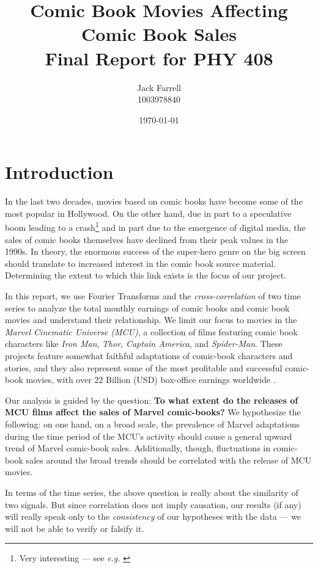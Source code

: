 \documentclass[12pt]{article}
\title{Comic Book Movies Affecting Comic Book Sales \vspace{0.5em} \\ \Large Final Report for PHY 408}
\date{\today}
\author{Jack Farrell \\ 1003978840}
\begin{document}


\maketitle

\tableofcontents

\section{Introduction}
In the last two decades, movies based on comic books have become some of the most popular in Hollywood.  On the other hand, due in part to a speculative boom leading to a crash\footnote{Very interesting --- see \textit{e.g.} \cite{crash}} and in part due to the emergence of digital media, the sales of comic books themselves have declined from their peak values in the 1990s.  In theory, the enormous success of the super-hero genre on the big screen should translate to increased interest in the comic book source material.  Determining the extent to which this link exists is the focus of our project.

In this report, we use Fourier Transforms and the \textit{cross-correlation} of two time series to analyze the total monthly earnings of comic books and comic book movies and understand their relationship. We limit our focus to movies in the \textit{Marvel Cinematic Universe (MCU)}, a collection of films featuring comic book characters like \textit{Iron Man}, \textit{Thor}, \textit{Captain America}, and \textit{Spider-Man}.  These projects feature somewhat faithful adaptations of comic-book characters and stories, and they also represent some of the most profitable and successful comic-book movies, with over 22 Billion (USD) box-office earnings worldwide \cite{boxofficemojo}.

Our analysis is guided by the question: \textbf{To what extent do the releases of MCU films affect the sales of Marvel comic-books?}  We hypothesize the following: on one hand, on a broad scale, the prevalence of Marvel adaptations during the time period of the MCU's activity should cause a general upward trend of Marvel comic-book sales.  Additionally, though, fluctuations in comic-book sales around the broad trends should be correlated with the release of MCU movies.

In terms of the time series, the above question is really about the similarity of two signals.  But since correlation does not imply causation, our results (if any) will really speak only to the \textit{consistency} of our hypotheses with the data --- we will not be able to verify or falsify it.
\end{document}
